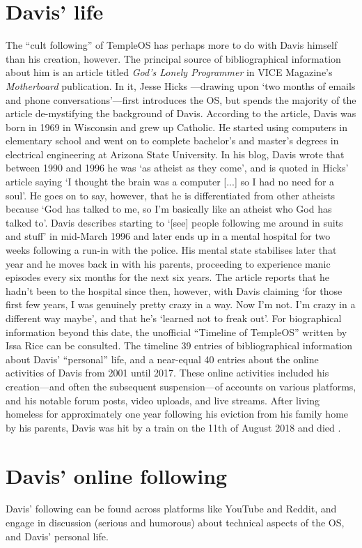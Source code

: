 \documentclass[Draft.tex]{subfiles}
\begin{document}
\section*{Davis' life}
The ``cult following'' of TempleOS has perhaps
more to do with Davis himself than his creation, however.
The principal source of bibliographical information about him is
an article titled \textit{God’s Lonely Programmer}
in VICE Magazine’s \textit{Motherboard} publication.
In it, Jesse Hicks \parencite*{Hicks14}---drawing
upon `two months of emails and phone conversations'---first
introduces the OS,
but spends the majority of the article de-mystifying the background of Davis.
According to the article,
Davis was born in 1969 in Wisconsin and grew up Catholic.
He started using computers in elementary school
and went on to complete bachelor's and master's degrees
in electrical engineering at Arizona State University.
In his blog, Davis \parencite*{Atheist} wrote that
between 1990 and 1996 he was `as atheist as they come',
and is quoted in Hicks' article saying
`I thought the brain was a computer [...] so I had no need for a soul'.
He goes on to say, however, that he is differentiated from other atheists
because `God has talked to me,
so I'm basically like an atheist who God has talked to'.
Davis describes starting to
`[see] people following me around in suits and stuff' in mid-March 1996
and later ends up in a mental hospital for two weeks
following a run-in with the police.
His mental state stabilises later that year
and he moves back in with his parents,
proceeding to experience manic episodes every six months for the next six years.
The article reports that he hadn't been to the hospital since then, however,
with Davis claiming
`for those first few years, I was genuinely pretty crazy in a way.
Now I'm not. I'm crazy in a different way maybe',
and that he's `learned not to freak out'.
For biographical information beyond this date,
the unofficial ``Timeline of TempleOS'' written by Issa Rice
\parencite*{Rice18} can be consulted.
The timeline 39 entries of bibliographical information
about Davis' ``personal'' life, and a near-equal 40 entries about
the online activities of Davis from 2001 until 2017.
These online activities included his creation---and
often the subsequent suspension---of accounts on various platforms,
and his notable forum posts, video uploads, and live streams.
After living homeless for approximately one year following
his eviction from his family home by his parents,
Davis was hit by a train on the 11th of August 2018 and died \parencite{Cecil18}.


\section*{Davis' online following}
Davis' following can be found across platforms like YouTube and Reddit,
and engage in discussion (serious and humorous) about
technical aspects of the OS, and Davis’ personal life.
\end{document}
